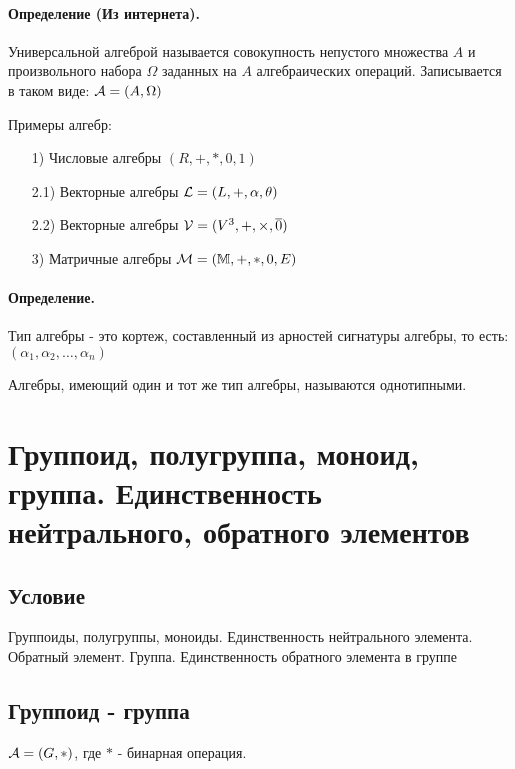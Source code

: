 \documentclass{report}
\begin{document}
\medskip

\paragraph*{Определение (Из интернета).}
Универсальной алгеброй называется совокупность непустого множества $A$
и произвольного набора $\Omega$ заданных на $A$ алгебраических операций.
Записывается в таком виде: ${\cal A} = (A, \Omega)$

\medskip

Примеры алгебр:
\begin{itemize}
    \item[1)] Числовые алгебры $(R, +, *, 0, 1)$
    \item[2.1)] Векторные алгебры ${\cal L} = (L, +, \alpha, \theta)$\newline
    \item[2.2)] Векторные алгебры ${\cal V} = (V^{3}, +, \times, \overline{0})$
    \item[3)] Матричные алгебры ${\cal M} = (\mathbb{M}, +, *, 0, E)$
\end{itemize}

\medskip

\paragraph*{Определение.}
Тип алгебры - это кортеж, составленный из арностей сигнатуры алгебры, то есть:
$(\alpha_{1}, \alpha_{2}, \ldots, \alpha_{n})$

Алгебры, имеющий один и тот же тип алгебры, называются однотипными.

\newpage

\section{Группоид, полугруппа, моноид, группа. Единственность нейтрального, обратного элементов}
\subsection{Условие}
Группоиды, полугруппы, моноиды. Единственность нейтрального элемента. Обратный
элемент. Группа. Единственность обратного элемента в группе

\subsection{Группоид - группа}
${\cal A} = (G, *)$, где $*$ - бинарная операция.
\end{document}
